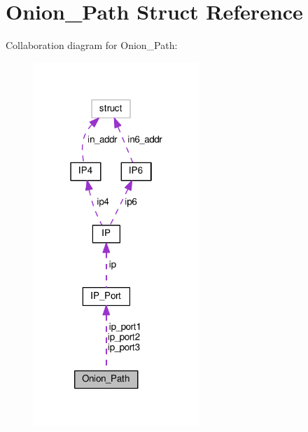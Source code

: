 \hypertarget{struct_onion___path}{\section{Onion\+\_\+\+Path Struct Reference}
\label{struct_onion___path}
}


Collaboration diagram for Onion\+\_\+\+Path\+:
\nopagebreak
\begin{figure}[H]
\begin{center}
\leavevmode
\includegraphics[width=178pt]{struct_onion___path__coll__graph}
\end{center}
\end{figure}
